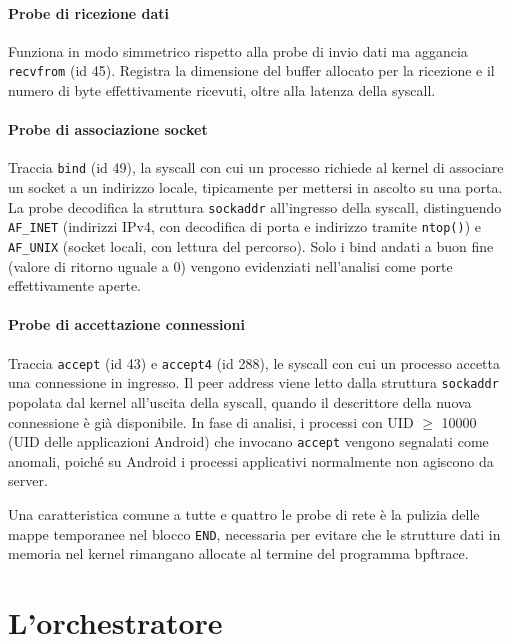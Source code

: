 \paragraph{Probe di ricezione dati} Funziona in modo simmetrico rispetto alla probe di invio dati ma aggancia \texttt{recvfrom} (id 45). Registra la dimensione del buffer allocato per la ricezione e il numero di byte effettivamente ricevuti, oltre alla latenza della syscall.


\paragraph{Probe di associazione socket} Traccia \texttt{bind} (id 49), la syscall con cui un processo richiede al kernel di associare un socket a un indirizzo locale, tipicamente per mettersi in ascolto su una porta. La probe decodifica la struttura \texttt{sockaddr} all'ingresso della syscall, distinguendo \texttt{AF\_INET} (indirizzi IPv4, con decodifica di porta e indirizzo tramite \texttt{ntop()}) e \texttt{AF\_UNIX} (socket locali, con lettura del percorso). Solo i bind andati a buon fine (valore di ritorno uguale a 0) vengono evidenziati nell'analisi come porte effettivamente aperte.


\paragraph{Probe di accettazione connessioni} Traccia \texttt{accept} (id 43) e \texttt{accept4} (id 288), le syscall con cui un processo accetta una connessione in ingresso. Il peer address viene letto dalla struttura \texttt{sockaddr} popolata dal kernel all'uscita della syscall, quando il descrittore della nuova connessione è già disponibile. In fase di analisi, i processi con UID $\geq$ 10000 (UID delle applicazioni Android) che invocano \texttt{accept} vengono segnalati come anomali, poiché su Android i processi applicativi normalmente non agiscono da server.

Una caratteristica comune a tutte e quattro le probe di rete è la pulizia delle mappe temporanee nel blocco \texttt{END}, necessaria per evitare che le strutture dati in memoria nel kernel rimangano allocate al termine del programma bpftrace.

\section{L'orchestratore}

